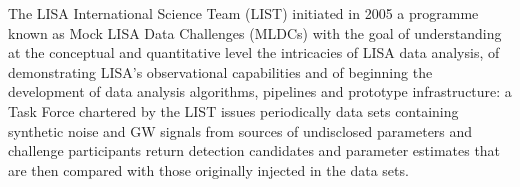 \documentclass{iopart}
\begin{document}

The LISA International Science Team (LIST) initiated in 2005 a programme known as Mock LISA Data Challenges (MLDCs) with the goal of understanding at the conceptual and quantitative level the intricacies of LISA data analysis, of demonstrating LISA's observational capabilities and of beginning the development of data analysis algorithms, pipelines and prototype infrastructure: a Task Force chartered by the LIST issues periodically data sets containing synthetic noise and GW signals from sources of undisclosed parameters and challenge participants return detection candidates and parameter estimates that are then compared with those originally injected in the data sets.

\end{document}

